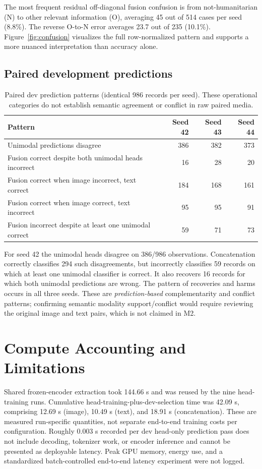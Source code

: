 \documentclass[11pt,a4paper]{article}
\begin{document}
The most frequent residual off-diagonal fusion confusion is from not-humanitarian (N) to other relevant information (O), averaging 45 out of 514 cases per seed (8.8\%). The reverse O-to-N error averages 23.7 out of 235 (10.1\%). Figure~\ref{fig:confusion} visualizes the full row-normalized pattern and supports a more nuanced interpretation than accuracy alone.

\subsection{Paired development predictions}
\begin{table}[htbp]
\centering\small
\caption{Paired dev prediction patterns (identical 986 records per seed). These operational categories do not establish semantic agreement or conflict in raw paired media.}
\label{tab:paired}
\begin{tabularx}{\linewidth}{@{}>{\raggedright\arraybackslash}Xrrr@{}}
\toprule
Pattern & Seed 42 & Seed 43 & Seed 44 \\
\midrule
Unimodal predictions disagree & 386 & 382 & 373 \\
Fusion correct despite both unimodal heads incorrect & 16 & 28 & 20 \\
Fusion correct when image incorrect, text correct & 184 & 168 & 161 \\
Fusion correct when image correct, text incorrect & 95 & 95 & 91 \\
Fusion incorrect despite at least one unimodal correct & 59 & 71 & 73 \\
\bottomrule
\end{tabularx}
\end{table}

For seed 42 the unimodal heads disagree on 386/986 observations. Concatenation correctly classifies 294 such disagreements, but incorrectly classifies 59 records on which at least one unimodal classifier is correct. It also recovers 16 records for which both unimodal predictions are wrong. The pattern of recoveries and harms occurs in all three seeds. These are \emph{prediction-based} complementarity and conflict patterns; confirming semantic modality support/conflict would require reviewing the original image and text pairs, which is not claimed in M2.

\section{Compute Accounting and Limitations}
Shared frozen-encoder extraction took 144.66 s and was reused by the nine head-training runs. Cumulative head-training-plus-dev-selection time was 42.09 s, comprising 12.69 s (image), 10.49 s (text), and 18.91 s (concatenation). These are measured run-specific quantities, not separate end-to-end training costs per configuration. Roughly 0.003 s recorded per dev head-only prediction pass does not include decoding, tokenizer work, or encoder inference and cannot be presented as deployable latency. Peak GPU memory, energy use, and a standardized batch-controlled end-to-end latency experiment were not logged.
\end{document}

